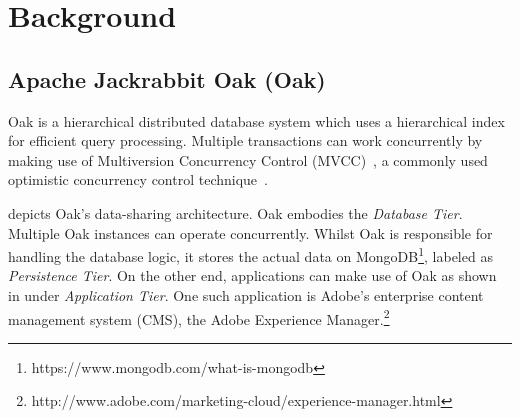 \documentclass[abstracton,12pt]{scrartcl}
\theoremstyle{definition}
\begin{document}

\section{Background}

\subsection{Apache Jackrabbit Oak (Oak)}

Oak is a hierarchical distributed database system which uses a
hierarchical index for efficient query processing. Multiple transactions can
work concurrently by making use of
Multiversion Concurrency Control (MVCC)~\cite{GW02}, a commonly used optimistic
concurrency control technique~\cite{TM11}.

 depicts Oak's data-sharing architecture. Oak embodies the
\textit{Database Tier}. Multiple Oak instances can operate concurrently.
Whilst Oak is responsible for handling the database logic, it stores the actual
data on MongoDB\footnote{https://www.mongodb.com/what-is-mongodb}, labeled as
\textit{Persistence Tier}. On the other end, applications can make use of Oak as
shown in  under \textit{Application Tier}.
One such application is Adobe's enterprise content management system (CMS),
the Adobe Experience
Manager.\footnote{http://www.adobe.com/marketing-cloud/experience-manager.html}
\end{document}
